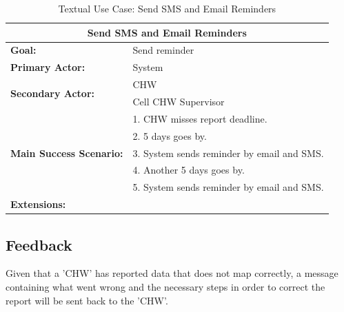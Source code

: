 \documentclass[a4paper]{report}
\begin{document}
\begin{table}[h]
	\centering
	\begin{tabular}{|l|l|}
		\hline
		\multicolumn{2}{|c|}{\textbf{Send SMS and Email Reminders}}\\
		\hline
		\textbf{Goal:} & Send reminder \\
		\hline
		\textbf{Primary Actor:} & System \\
		\hline
		\multirow{2}{*}{\textbf{Secondary Actor:}}	& CHW \\
																								& Cell CHW Supervisor \\
		\hline
		\multirow{5}{*}{\textbf{Main Success Scenario:}}	& 1. CHW misses report deadline. \\
																											& 2. 5 days goes by. \\
																											& 3. System sends reminder by email and SMS. \\
																											& 4. Another 5 days goes by. \\
																											& 5. System sends reminder by email and SMS. \\
																											
		\hline
		\textbf{Extensions:} & \\
		\hline
	\end{tabular}
	\caption{Textual Use Case: Send SMS and Email Reminders}
\end{table}
\pagebreak

\subsection{Feedback}

Given that a 'CHW' has reported data that does not map correctly, a message containing what went wrong and the necessary steps in order to correct the report will be sent back to the 'CHW'.
\end{document}
